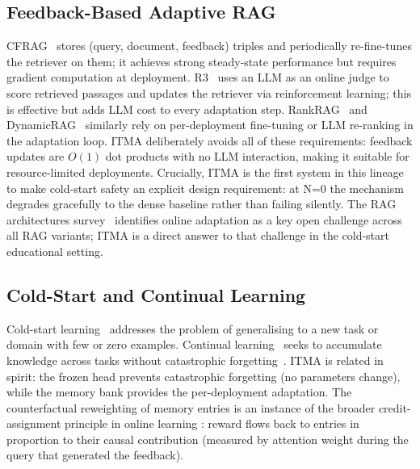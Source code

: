 \documentclass[preprint,12pt]{elsarticle}
\begin{document}
\subsection{Feedback-Based Adaptive RAG}
CFRAG~\citep{cfrag2025} stores (query, document, feedback) triples and
periodically re-fine-tunes the retriever on them; it achieves strong
steady-state performance but requires gradient computation at deployment.
R3~\citep{r32025} uses an LLM as an online judge to score retrieved passages
and updates the retriever via reinforcement learning; this is effective but
adds LLM cost to every adaptation step.  RankRAG~\citep{rankrag2024} and
DynamicRAG~\citep{dynamicrag2024} similarly rely on per-deployment fine-tuning
or LLM re-ranking in the adaptation loop.  ITMA deliberately avoids all of these requirements: feedback updates are
$O(1)$ dot products with no LLM interaction, making it suitable for
resource-limited deployments.  Crucially, ITMA is the first system in this
lineage to make cold-start safety an explicit design requirement: at N=0 the
mechanism degrades gracefully to the dense baseline rather than failing silently.
The RAG architectures survey~\citep{gao2024ragsurv} identifies online
adaptation as a key open challenge across all RAG variants; ITMA is a direct
answer to that challenge in the cold-start educational setting.

\subsection{Cold-Start and Continual Learning}
Cold-start learning~\citep{pan2010transferlearning} addresses the problem of
generalising to a new task or domain with few or zero examples.  Continual
learning~\citep{kirkpatrick2017ewc} seeks to accumulate knowledge across tasks
without catastrophic forgetting~\citep{mccloskey1989catastrophic}.  ITMA is
related in spirit: the frozen head prevents catastrophic forgetting (no
parameters change), while the memory bank provides the per-deployment
adaptation.  The counterfactual reweighting of memory entries is an instance
of the broader credit-assignment principle in online learning
\citep{suttonbarto2018rl}: reward flows back to entries in proportion to their
causal contribution (measured by attention weight during the query that
generated the feedback).
\end{document}
